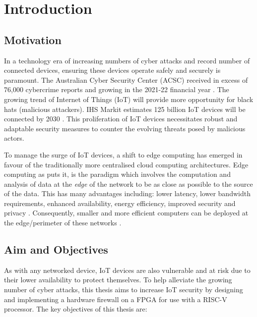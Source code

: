 \chapter[Introduction]{Introduction}
\label{Chap:Intro}



\section{Motivation}


In a technology era of increasing numbers of cyber attacks and record number of connected devices, ensuring these devices operate safely and securely is 
paramount. The Australian Cyber Security Center (ACSC) received in 
excess of 76,000 cybercrime reports and growing in the 2021-22 financial year \cite{acsc_2022}. The growing trend of Internet of Things (IoT) will provide 
more opportunity for black hats (malicious attackers). IHS Markit estimates 125 billion IoT devices will be connected by 2030 \cite{IHS_iot}.
This proliferation of IoT devices necessitates robust and adaptable security measures to counter the evolving threats posed by malicious actors. 

To manage the surge of IoT devices, a shift to edge computing has emerged in favour of the traditionally more centralised cloud computing 
architectures. Edge computing as \cite{EdgeComputing} puts it, is the paradigm which involves the computation and analysis of data 
at the \textit{edge} of the network to be as close as possible to the source of the data. This has many advantages including: lower latency, lower bandwidth requirements,
enhanced availability, energy efficiency, improved security and privacy \cite{EdgeComputing}. Consequently, smaller and more efficient computers can be deployed 
at the edge/perimeter of these networks \cite{EdgeComputingPerspectives}. 



\section{Aim and Objectives}

As with any networked device, IoT devices are also vulnerable and at risk due to their lower availability to protect themselves. To help alleviate the growing number of cyber attacks, this thesis aims to increase IoT security by designing and implementing a hardware firewall on a FPGA for use with a RISC-V processor. The key objectives of this thesis are:


